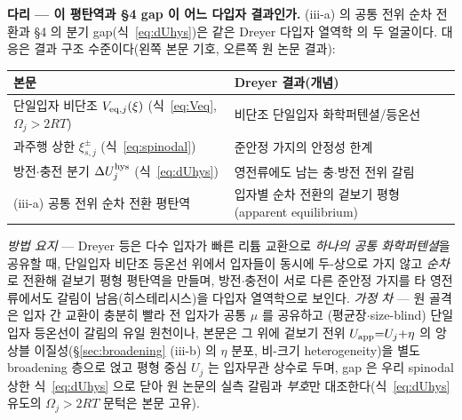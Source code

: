 \begin{srcbox}
\textbf{다리 --- 이 평탄역과 §4 gap 이 어느 다입자 결과인가.} (iii-a) 의 공통 전위 순차 전환과 §4 의 분기
gap(식~\eqref{eq:dUhys})은 같은 Dreyer 다입자 열역학\cite{dreyer2010,dreyer2011} 의 두 얼굴이다. 대응은
결과 구조 수준이다(왼쪽 본문 기호, 오른쪽 원 논문 결과):
\begin{center}\footnotesize
\begin{tabular}{@{}ll@{}}
\hline
본문 & Dreyer\cite{dreyer2010,dreyer2011} 결과(개념) \\
\hline
단일입자 비단조 $V_{\mathrm{eq},j}(\xi)$ (식~\eqref{eq:Veq}, $\Omega_j{>}2RT$) & 비단조 단일입자 화학퍼텐셜/등온선 \\
과주행 상한 $\xi_{s,j}^\pm$ (식~\eqref{eq:spinodal}) & 준안정 가지의 안정성 한계 \\
방전$\cdot$충전 분기 $\Delta U_j^{\mathrm{hys}}$ (식~\eqref{eq:dUhys}) & 영전류에도 남는 충$\cdot$방전 전위 갈림 \\
(iii-a) 공통 전위 순차 전환 평탄역 & 입자별 순차 전환의 겉보기 평형(apparent equilibrium) \\
\hline
\end{tabular}
\end{center}
\emph{방법 요지} --- Dreyer 등은 다수 입자가 빠른 리튬 교환으로 \emph{하나의 공통 화학퍼텐셜}을 공유할 때,
단일입자 비단조 등온선 위에서 입자들이 동시에 두-상으로 가지 않고 \emph{순차}로 전환해 겉보기 평형 평탄역을
만들며, 방전$\cdot$충전이 서로 다른 준안정 가지를 타 영전류에서도 갈림이 남음(히스테리시스)을 다입자
열역학으로 보인다. \emph{가정 차} --- 원 골격은 입자 간 교환이 충분히 빨라 전 입자가 공통 $\mu$ 를 공유하고
(평균장$\cdot$size-blind) 단일입자 등온선이 갈림의 유일 원천이나, 본문은 그 위에 겉보기 전위
$U_{\mathrm{app}}{=}U_j{+}\eta$ 의 앙상블 이질성(\S\ref{sec:broadening} (iii-b) 의 $\eta$ 분포, 비-크기
heterogeneity)을 별도 broadening 층으로 얹고 평형 중심 $U_j$ 는 입자무관 상수로 두며, gap 은 우리 spinodal
상한 식~\eqref{eq:dUhys} 으로 닫아 원 논문의 실측 갈림과 \emph{부호}만 대조한다(식~\eqref{eq:dUhys} 유도의
$\Omega_j{>}2RT$ 문턱은 본문 고유).
\end{srcbox}

